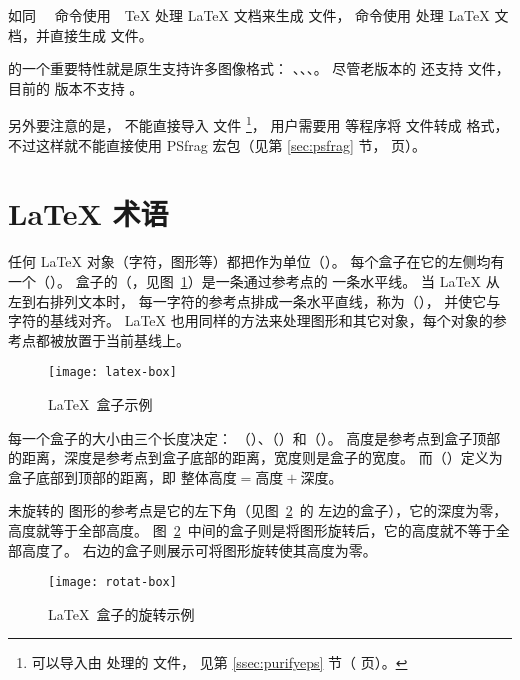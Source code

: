 如同 　命令使用　\TeX{} 处理 \LaTeX{} 文档来生成  文件，
 命令使用 \pdfTeX{} 处理 \LaTeX{} 文档，并直接生成  文件。
 
\pdfTeX{} 的一个重要特性就是原生支持许多图像格式：
、、、。
尽管老版本的 \pdfTeX{} 还支持  文件，目前的 \pdfTeX{} 版本不支持 。

另外要注意的是，\pdfTeX{} 不能直接导入  文件
\footnote{\pdfTeX{} 可以导入由  处理的  文件，
	见第 \ref{ssec:purifyeps} 节（\pageref{ssec:purifyeps} 页）。}，
用户需要用  等程序将  文件转成  格式，
不过这样就不能直接使用 PSfrag 宏包（见第 \ref{sec:psfrag} 节，\pageref{sec:psfrag} 页）。

\section{\LaTeX{} 术语}\label{sec:terminology}

任何 \LaTeX{} 对象（字符，图形等）都把作为单位（\cite[page 103]{Leslie}）。
每个盒子在它的左侧均有一个（）。
盒子的（，见图~\ref{fig:samplebox}）是一条通过参考点的
一条水平线。
当 \LaTeX{} 从左到右排列文本时，
每一字符的参考点排成一条水平直线，称为（），
并使它与字符的基线对齐。
\LaTeX{} 也用同样的方法来处理图形和其它对象，每个对象的参考点都被放置于当前基线上。

\begin{figure}
	\centering
	\texttt{[image: latex-box]}
	\caption{\LaTeX{}~盒子示例}
	\label{fig:samplebox}
\end{figure}

每一个盒子的大小由三个长度决定：
（）、（）和（）。
高度是参考点到盒子顶部的距离，深度是参考点到盒子底部的距离，宽度则是盒子的宽度。
而（）定义为盒子底部到顶部的距离，即
$\text{整体高度} = \text{高度} + \text{深度}$。

未旋转的  图形的参考点是它的左下角（见图~\ref{fig:rotate-box}~的
左边的盒子），它的深度为零，高度就等于全部高度。
图~\ref{fig:rotate-box}~中间的盒子则是将图形旋转后，它的高度就不等于全部高度了。
右边的盒子则展示可将图形旋转使其高度为零。

\begin{figure}
	\centering
	\texttt{[image: rotat-box]}
	\caption{\LaTeX{}~盒子的旋转示例}\label{fig:rotate-box}
\end{figure}

